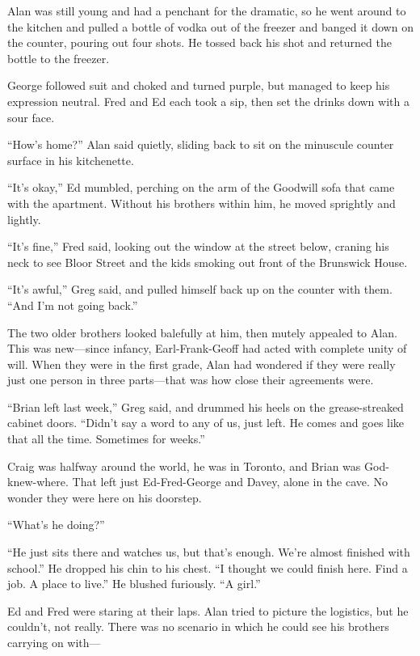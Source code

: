 \documentclass{article}
\begin{document}
Alan was still young and had a penchant for the dramatic, so he went
around to the kitchen and pulled a bottle of vodka out of the freezer
and banged it down on the counter, pouring out four shots.  He tossed
back his shot and returned the bottle to the freezer.

George followed suit and choked and turned purple, but managed to keep
his expression neutral.  Fred and Ed each took a sip, then set the
drinks down with a sour face.

``How's home?'' Alan said quietly, sliding back to sit on the
minuscule counter surface in his kitchenette.

``It's okay,'' Ed mumbled, perching on the arm of the Goodwill sofa
that came with the apartment.  Without his brothers within him, he
moved sprightly and lightly.

``It's fine,'' Fred said, looking out the window at the street below,
craning his neck to see Bloor Street and the kids smoking out front of
the Brunswick House.

``It's awful,'' Greg said, and pulled himself back up on the counter
with them.  ``And I'm not going back.''

The two older brothers looked balefully at him, then mutely appealed
to Alan.  This was new---since infancy, Earl-Frank-Geoff had acted
with complete unity of will.  When they were in the first grade, Alan
had wondered if they were really just one person in three parts---that
was how close their agreements were.

``Brian left last week,'' Greg said, and drummed his heels on the
grease-streaked cabinet doors.  ``Didn't say a word to any of us, just
left.  He comes and goes like that all the time.  Sometimes for
weeks.''

Craig was halfway around the world, he was in Toronto, and Brian was
God-knew-where.  That left just Ed-Fred-George and Davey, alone in the
cave.  No wonder they were here on his doorstep.

``What's he doing?''

``He just sits there and watches us, but that's enough.  We're almost
finished with school.'' He dropped his chin to his chest.  ``I thought
we could finish here.  Find a job.  A place to live.'' He blushed
furiously.  ``A girl.''

Ed and Fred were staring at their laps.  Alan tried to picture the
logistics, but he couldn't, not really.  There was no scenario in
which he could see his brothers carrying on with---
\end{document}
